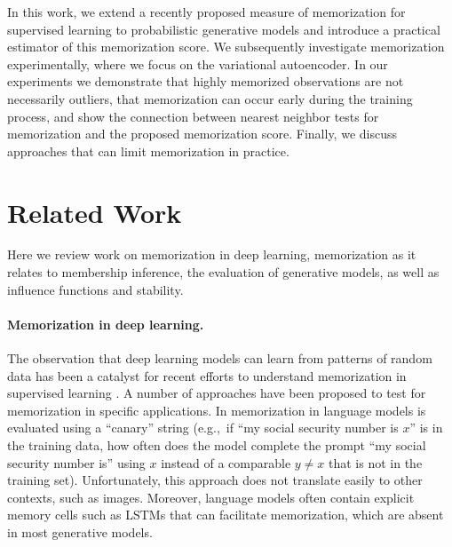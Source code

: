 \documentclass{article}
\begin{document}
In this work, we extend a recently proposed measure of memorization for 
supervised learning \cite{feldman2019does,feldman2020what} to probabilistic 
generative models and introduce a practical estimator of this memorization 
score.  We subsequently investigate memorization experimentally, where we 
focus on the variational autoencoder. In our experiments we demonstrate that 
highly memorized observations are not necessarily outliers, that memorization 
can occur early during the training process, and show the connection between 
nearest neighbor tests for memorization and the proposed memorization score.  
Finally, we discuss approaches that can limit memorization in practice.

\section{Related Work}%
\label{sec:related_work}

Here we review work on memorization in deep learning, memorization as it 
relates to membership inference, the evaluation of generative models, as well 
as influence functions and stability.

\paragraph{Memorization in deep learning.} The observation that deep learning 
models can learn from patterns of random data has been a catalyst for recent 
efforts to understand memorization in supervised learning 
\cite{zhang2017understanding,arpit2017closer,stephenson2021on}. A number of 
approaches have been proposed to test for memorization in specific 
applications. In \cite{carlini2019secret} memorization in language models is 
evaluated using a ``canary'' string (e.g.,~if ``my social security number is 
$x$'' is in the training data, how often does the model complete the prompt 
``my social security number is'' using $x$ instead of a comparable $y \neq x$ 
that is not in the training set).  Unfortunately, this approach does not 
translate easily to other contexts, such as images. Moreover, language models 
often contain explicit memory cells such as LSTMs \cite{hochreiter1997long} 
that can facilitate memorization, which are absent in most generative models.
\end{document}
